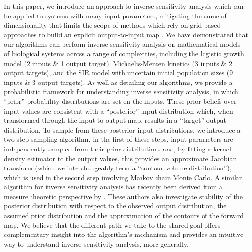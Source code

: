 \documentclass[10pt,letterpaper]{article}
\begin{document}
In this paper, we introduce an approach to inverse sensitivity analysis which can be applied to systems with many input parameters, mitigating the curse of dimensionality that limits the scope of  methods which rely on grid-based approaches to build an explicit output-to-input map \cite{butler2014measure}. We have demonstrated that our algorithms can perform inverse sensitivity analysis on mathematical models of biological systems across a range of complexities, including the logistic growth model (2 inputs \& 1 output target), Michaelis-Menten kinetics (3 inputs \& 2 output targets), and the SIR model with uncertain initial population sizes (9 inputs \& 3 output targets). As well as detailing our algorithms, we provide a probabilistic framework for understanding inverse sensitivity analysis, in which ``prior'' probability distributions are set on the inputs. These prior beliefs over input values are consistent with a ``posterior'' input distribution which, when transformed through the input-to-output map, results in a ``target'' output distribution. To sample from these posterior input distributions, we introduce a two-step sampling algorithm. In the first of these steps, input parameters are independently sampled from their prior distributions and, by fitting a kernel density estimator to the output values, this provides an approximate Jacobian transform (which we interchangeably term a ``contour volume distribution''), which is used in the second step involving Markov chain Monte Carlo. A similar algorithm for inverse sensitivity analysis has recently been derived from a measure theoretic perspective by \cite{BJW-17}. These authors also investigate stability of the posterior distribution with respect to the observed output distribution, the assumed prior distribution and the approximation of the contours of the forward map. We believe that the different path we take to the shared goal offers complementary insight into the algorithm's mechanism and provides an intuitive way to understand inverse sensitivity analysis, more generally.
\end{document}
